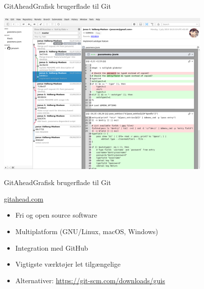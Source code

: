 \documentclass[10pt]{beamer}
\begin{document}
\begin{frame}{GitAhead}{Grafisk brugerflade til Git}
  \begin{center}
    \includegraphics[width=0.8\textwidth]{img/gitahead}
  \end{center}
\end{frame}

\begin{frame}{GitAhead}{Grafisk brugerflade til Git}
  \begin{block}{\url{gitahead.com}}
    \begin{itemize}
    \item Fri og open source software
    \item Multiplatform (GNU/Linux, macOS, Windows)
    \item Integration med GitHub
    \item Vigtigste værktøjer let tilgængelige
    \item Alternativer: \url{https://git-scm.com/downloads/guis}
    \end{itemize}
  \end{block}
\end{frame}
\end{document}
